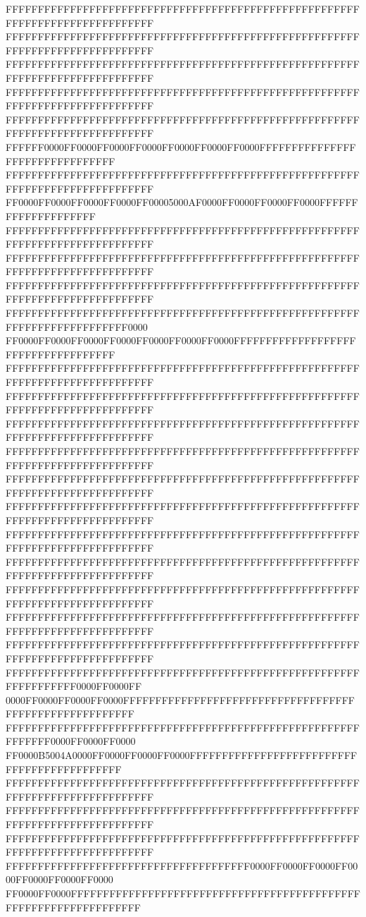 FFFFFFFFFFFFFFFFFFFFFFFFFFFFFFFFFFFFFFFFFFFFFFFFFFFFFFFFFFFFFFFFFFFFFFFFFFFFFF
FFFFFFFFFFFFFFFFFFFFFFFFFFFFFFFFFFFFFFFFFFFFFFFFFFFFFFFFFFFFFFFFFFFFFFFFFFFFFF
FFFFFFFFFFFFFFFFFFFFFFFFFFFFFFFFFFFFFFFFFFFFFFFFFFFFFFFFFFFFFFFFFFFFFFFFFFFFFF
FFFFFFFFFFFFFFFFFFFFFFFFFFFFFFFFFFFFFFFFFFFFFFFFFFFFFFFFFFFFFFFFFFFFFFFFFFFFFF
FFFFFFFFFFFFFFFFFFFFFFFFFFFFFFFFFFFFFFFFFFFFFFFFFFFFFFFFFFFFFFFFFFFFFFFFFFFFFF
FFFFFF0000FF0000FF0000FF0000FF0000FF0000FF0000FFFFFFFFFFFFFFFFFFFFFFFFFFFFFFFF
FFFFFFFFFFFFFFFFFFFFFFFFFFFFFFFFFFFFFFFFFFFFFFFFFFFFFFFFFFFFFFFFFFFFFFFFFFFFFF
FF0000FF0000FF0000FF0000FF00005000AF0000FF0000FF0000FF0000FFFFFFFFFFFFFFFFFFFF
FFFFFFFFFFFFFFFFFFFFFFFFFFFFFFFFFFFFFFFFFFFFFFFFFFFFFFFFFFFFFFFFFFFFFFFFFFFFFF
FFFFFFFFFFFFFFFFFFFFFFFFFFFFFFFFFFFFFFFFFFFFFFFFFFFFFFFFFFFFFFFFFFFFFFFFFFFFFF
FFFFFFFFFFFFFFFFFFFFFFFFFFFFFFFFFFFFFFFFFFFFFFFFFFFFFFFFFFFFFFFFFFFFFFFFFFFFFF
FFFFFFFFFFFFFFFFFFFFFFFFFFFFFFFFFFFFFFFFFFFFFFFFFFFFFFFFFFFFFFFFFFFFFFFFFF0000
FF0000FF0000FF0000FF0000FF0000FF0000FF0000FFFFFFFFFFFFFFFFFFFFFFFFFFFFFFFFFFFF
FFFFFFFFFFFFFFFFFFFFFFFFFFFFFFFFFFFFFFFFFFFFFFFFFFFFFFFFFFFFFFFFFFFFFFFFFFFFFF
FFFFFFFFFFFFFFFFFFFFFFFFFFFFFFFFFFFFFFFFFFFFFFFFFFFFFFFFFFFFFFFFFFFFFFFFFFFFFF
FFFFFFFFFFFFFFFFFFFFFFFFFFFFFFFFFFFFFFFFFFFFFFFFFFFFFFFFFFFFFFFFFFFFFFFFFFFFFF
FFFFFFFFFFFFFFFFFFFFFFFFFFFFFFFFFFFFFFFFFFFFFFFFFFFFFFFFFFFFFFFFFFFFFFFFFFFFFF
FFFFFFFFFFFFFFFFFFFFFFFFFFFFFFFFFFFFFFFFFFFFFFFFFFFFFFFFFFFFFFFFFFFFFFFFFFFFFF
FFFFFFFFFFFFFFFFFFFFFFFFFFFFFFFFFFFFFFFFFFFFFFFFFFFFFFFFFFFFFFFFFFFFFFFFFFFFFF
FFFFFFFFFFFFFFFFFFFFFFFFFFFFFFFFFFFFFFFFFFFFFFFFFFFFFFFFFFFFFFFFFFFFFFFFFFFFFF
FFFFFFFFFFFFFFFFFFFFFFFFFFFFFFFFFFFFFFFFFFFFFFFFFFFFFFFFFFFFFFFFFFFFFFFFFFFFFF
FFFFFFFFFFFFFFFFFFFFFFFFFFFFFFFFFFFFFFFFFFFFFFFFFFFFFFFFFFFFFFFFFFFFFFFFFFFFFF
FFFFFFFFFFFFFFFFFFFFFFFFFFFFFFFFFFFFFFFFFFFFFFFFFFFFFFFFFFFFFFFFFFFFFFFFFFFFFF
FFFFFFFFFFFFFFFFFFFFFFFFFFFFFFFFFFFFFFFFFFFFFFFFFFFFFFFFFFFFFFFFFFFFFFFFFFFFFF
FFFFFFFFFFFFFFFFFFFFFFFFFFFFFFFFFFFFFFFFFFFFFFFFFFFFFFFFFFFFFFFFFF0000FF0000FF
0000FF0000FF0000FF0000FFFFFFFFFFFFFFFFFFFFFFFFFFFFFFFFFFFFFFFFFFFFFFFFFFFFFFFF
FFFFFFFFFFFFFFFFFFFFFFFFFFFFFFFFFFFFFFFFFFFFFFFFFFFFFFFFFFFFFF0000FF0000FF0000
FF0000B5004A0000FF0000FF0000FF0000FFFFFFFFFFFFFFFFFFFFFFFFFFFFFFFFFFFFFFFFFFFF
FFFFFFFFFFFFFFFFFFFFFFFFFFFFFFFFFFFFFFFFFFFFFFFFFFFFFFFFFFFFFFFFFFFFFFFFFFFFFF
FFFFFFFFFFFFFFFFFFFFFFFFFFFFFFFFFFFFFFFFFFFFFFFFFFFFFFFFFFFFFFFFFFFFFFFFFFFFFF
FFFFFFFFFFFFFFFFFFFFFFFFFFFFFFFFFFFFFFFFFFFFFFFFFFFFFFFFFFFFFFFFFFFFFFFFFFFFFF
FFFFFFFFFFFFFFFFFFFFFFFFFFFFFFFFFFFFFF0000FF0000FF0000FF0000FF0000FF0000FF0000
FF0000FF0000FFFFFFFFFFFFFFFFFFFFFFFFFFFFFFFFFFFFFFFFFFFFFFFFFFFFFFFFFFFFFFFFFF
